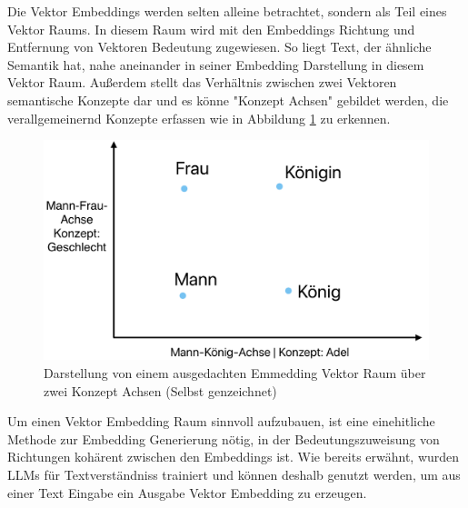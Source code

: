 \documentclass[../main.tex]{subfiles}
\begin{document}
Die Vektor Embeddings werden selten alleine betrachtet, sondern als Teil eines Vektor Raums.
In diesem Raum wird mit den Embeddings Richtung und Entfernung von Vektoren Bedeutung zugewiesen.
So liegt Text, der ähnliche Semantik hat, nahe aneinander in seiner Embedding Darstellung in diesem Vektor Raum.
Außerdem stellt das Verhältnis zwischen zwei Vektoren semantische Konzepte dar und es könne "Konzept Achsen" gebildet werden, die verallgemeinernd Konzepte erfassen wie in Abbildung \ref{fig:embeddingspace} zu erkennen.
\cite{heimerl2018interactive,mikolov2013efficient}

\begin{figure}[ht]
    \centering
    \includegraphics[scale=.23]{"bilder/embeddingspace.png"}
    \caption{Darstellung von einem ausgedachten Emmedding Vektor Raum über zwei Konzept Achsen (Selbst genzeichnet)}
    \label{fig:embeddingspace}
\end{figure}

Um einen Vektor Embedding Raum sinnvoll aufzubauen, ist eine einehitliche Methode zur Embedding Generierung nötig, in der Bedeutungszuweisung von Richtungen kohärent zwischen den Embeddings ist.
Wie bereits erwähnt, wurden \glspl{LLM} für Textverständniss trainiert und können deshalb genutzt werden, um aus einer Text Eingabe ein Ausgabe Vektor Embedding zu erzeugen.
\cite{zhang2023language}
\end{document}
